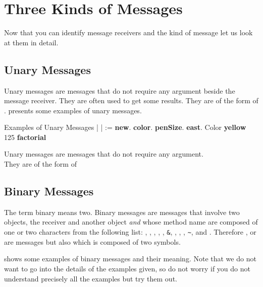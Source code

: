 \section{Three Kinds of Messages}
Now that you can identify message receivers and the kind of message let us look at them in detail. 


\subsection*{Unary Messages} 
Unary messages are messages that do not require any argument beside the message receiver. They are often used to get some results.  They are of the form of .  presents some examples of unary messages. 

\begin{scriptwithtitle}{Examples of Unary Messages}\label{scr:unary}
| \caro |
\caro := \Turtle \textbf{new}.
\caro \textbf{color}.
\caro \textbf{penSize}.
\caro \textbf{east}.
Color \textbf{yellow}
125 \textbf{factorial}
\end{scriptwithtitle}

\begin{largecadre}{Unary messages are messages that do not require any argument.\\
They are of the form of }
\end{largecadre}

\subsection*{Binary Messages} The term binary means two. Binary messages are messages that involve two objects, the receiver and another object \textit{and} whose method name are composed of  one or two characters from the following list: \ct{+}, \ct{-}, \ct{*}, \ct{/}, \ct{|}, \texttt{\&}, \ct{=}, \ct{>}, \ct{<}, \texttt{\~}, and .
Therefore \ct{+}, \ct{=} or \ct{*} are messages but also \ct{=>} which is composed of two symbols.


 shows some examples of binary messages and their meaning. Note that we do not want to go into the details of the examples given, so do not worry if you do not understand precisely all the examples but try them out.




